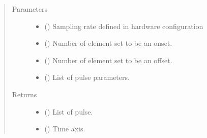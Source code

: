 \documentclass[letterpaper,10pt,english]{sphinxmanual}
\begin{document}
\begin{fulllineitems}
\label{\detokenize{NoSeMazeControl/PyPulse:PyPulse.PulseInterface.make_pulse}}
\pysigstartsignatures
{}
\pysigstopsignatures\begin{quote}\begin{description}
\item[{Parameters}] \leavevmode\begin{itemize}
\item {} 
\sphinxAtStartPar
{} () \textendash{} Sampling rate defined in hardware configuration

\item {} 
\sphinxAtStartPar
{} () \textendash{} Number of element set to be an onset.

\item {} 
\sphinxAtStartPar
{} () \textendash{} Number of element set to be an offset.

\item {} 
\sphinxAtStartPar
{} () \textendash{} List of pulse parameters.

\end{itemize}

\item[{Returns}] \leavevmode
\sphinxAtStartPar
\begin{itemize}
\item {} 
\sphinxAtStartPar
{} () \textendash{} List of pulse.

\item {} 
\sphinxAtStartPar
{} () \textendash{} Time axis.

\end{itemize}


\end{description}\end{quote}

\end{fulllineitems}
\end{document}
